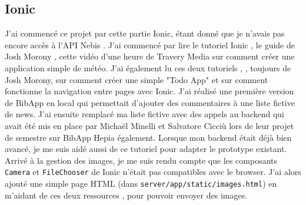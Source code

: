 \documentclass[a4paper, 12pt]{article}
\begin{document}
\subsection{Ionic}
J'ai commencé ce projet par cette partie Ionic, étant donné que je n'avais pas encore accès à l'API Nebis \cite{ref80}.
J'ai commencé par lire le tutoriel Ionic \cite{ref0}, le guide de Josh Morony \cite{ref10}, cette vidéo d'une heure
de Travery Media \cite{ref18} sur comment créer une application simple de météo. J'ai également lu ces deux tutoriels
\cite{ref40}, \cite{ref50}, toujours de Josh Morony, sur comment créer une simple "Todo App" et sur comment fonctionne
la navigation entre pages avec Ionic. J'ai réalisé une première version de BibApp en local qui permettait d'ajouter
des commentaires à une liste fictive de news. J'ai ensuite remplacé ma liste fictive avec des appels au backend qui
avait été mis en place par Michaël Minelli et Salvatore Cicciù lors de leur projet de semestre sur BibApp Hepia
également. Lorsque mon backend était déjà bien avancé, je me suis aidé aussi de ce tutoriel \cite{ref90} pour adapter
le prototype existant. Arrivé à la gestion des images, je me suis rendu compte que les composants \texttt{Camera}
et \texttt{FileChooser} de Ionic n'était pas compatibles avec le browser. J'ai alors ajouté une simple page
HTML (dans \texttt{server/app/static/images.html}) en m'aidant de ces deux ressources \cite{ref140}, \cite{ref150}
pour pouvoir envoyer des images.
\end{document}
